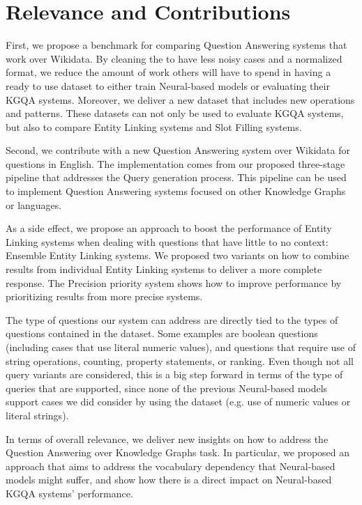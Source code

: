 \section{Relevance and Contributions}
\label{cap6:conclusions/relevanceContributions}
First, we propose a benchmark for comparing Question Answering systems that work over Wikidata. By 
cleaning the \LCQuADtwo{} to have less noisy cases and a normalized format, we reduce the amount of 
work others will have to spend in having a ready to use dataset to either train Neural-based models 
or evaluating their KGQA systems. Moreover, we deliver a new dataset that includes new \SPARQL{} 
operations and patterns. These datasets can not only be used to evaluate KGQA systems, but also to 
compare Entity Linking systems and Slot Filling systems.

Second, we contribute with a new Question Answering system over Wikidata for questions in English. 
The implementation comes from our proposed three-stage pipeline that addresses the \SPARQL{} Query 
generation process. This pipeline can be used to implement Question Answering systems focused on 
other Knowledge Graphs or languages. 

As a side effect, we propose an approach to boost the performance of Entity Linking systems when 
dealing with questions that have little to no context: Ensemble Entity Linking systems. We proposed 
two variants on how to combine results from individual Entity Linking systems to deliver a more 
complete response. The Precision priority system shows how to improve performance by prioritizing 
results from more precise systems. 

The type of questions our system can address are directly tied to the types of questions contained in 
the \LCQuADtwo{} dataset. Some examples are boolean questions (including cases that use literal numeric 
values), and questions that require use of string operations, counting, property statements, or 
ranking. Even though not all query variants are considered, this is a big step forward in terms of 
the type of queries that are supported, since none of the previous Neural-based models support cases 
we did consider by using the \LCQuADtwo{} dataset (e.g. use of numeric values or literal strings). 

In terms of overall relevance, we deliver new insights on how to address the Question Answering over 
Knowledge Graphs task. In particular, we proposed an approach that aims to address the vocabulary 
dependency that Neural-based models might suffer, and show how there is a direct impact on 
Neural-based KGQA systems’ performance. 

